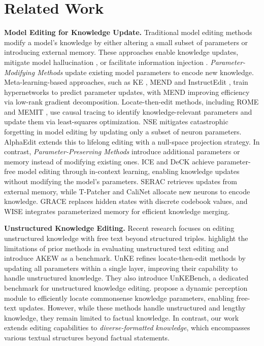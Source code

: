 \section{Related Work}

\textbf{Model Editing for Knowledge Update.}  
Traditional model editing methods modify a model's knowledge by either altering a small subset of parameters or introducing external memory. These approaches enable knowledge updates, mitigate model hallucination \cite{hallu_edit}, or facilitate information injection \cite{harm_edit}. \textit{Parameter-Modifying Methods} update existing model parameters to encode new knowledge. Meta-learning-based approaches, such as KE \cite{KE}, MEND \cite{MEND} and InstructEdit \cite{InstructEdit}, train hypernetworks to predict parameter updates, with MEND improving efficiency via low-rank gradient decomposition. Locate-then-edit methods, including ROME \cite{ROME} and MEMIT \cite{MEMIT}, use causal tracing to identify knowledge-relevant parameters and update them via least-squares optimization. NSE \cite{NSE} mitigates catastrophic forgetting in model editing by updating only a subset of neuron parameters. AlphaEdit \cite{AlphaEdit} extends this to lifelong editing with a null-space projection strategy. In contrast, \textit{Parameter-Preserving Methods} introduce additional parameters or memory instead of modifying existing ones. ICE \cite{ICE} and DeCK \cite{DeCK} achieve parameter-free model editing through in-context learning, enabling knowledge updates without modifying the model's parameters. SERAC \cite{SERAC} retrieves updates from external memory, while T-Patcher \cite{T-patcher} and CaliNet \cite{calinet} allocate new neurons to encode knowledge. GRACE \cite{grace} replaces hidden states with discrete codebook values, and WISE \cite{wise} integrates parameterized memory for efficient knowledge merging.

\textbf{Unstructured Knowledge Editing.}  
Recent research focuses on editing unstructured knowledge with free text beyond structured triples. \citet{AKEW} highlight the limitations of prior methods in evaluating unstructured text editing and introduce AKEW as a benchmark. UnKE \cite{UnKE} refines locate-then-edit methods by updating all parameters within a single layer, improving their capability to handle unstructured knowledge. They also introduce UnKEBench, a dedicated benchmark for unstructured knowledge editing. \citet{freetext} propose a dynamic perception module to efficiently locate commonsense knowledge parameters, enabling free-text updates. However, while these methods handle unstructured and lengthy knowledge, they remain limited to factual knowledge. In contrast, our work extends editing capabilities to \textit{diverse-formatted knowledge}, which encompasses various textual structures beyond factual statements.


